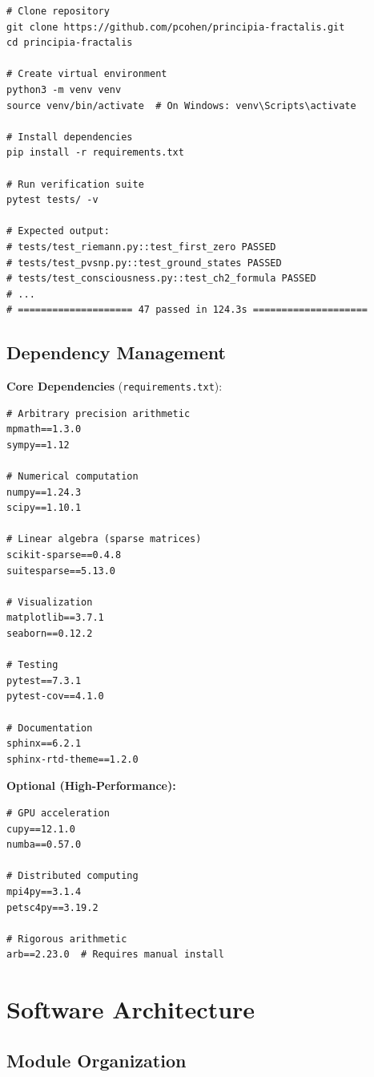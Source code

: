 \begin{verbatim}
# Clone repository
git clone https://github.com/pcohen/principia-fractalis.git
cd principia-fractalis

# Create virtual environment
python3 -m venv venv
source venv/bin/activate  # On Windows: venv\Scripts\activate

# Install dependencies
pip install -r requirements.txt

# Run verification suite
pytest tests/ -v

# Expected output:
# tests/test_riemann.py::test_first_zero PASSED
# tests/test_pvsnp.py::test_ground_states PASSED
# tests/test_consciousness.py::test_ch2_formula PASSED
# ...
# ==================== 47 passed in 124.3s ====================
\end{verbatim}

\subsection{Dependency Management}

\textbf{Core Dependencies} (\texttt{requirements.txt}):
\begin{verbatim}
# Arbitrary precision arithmetic
mpmath==1.3.0
sympy==1.12

# Numerical computation
numpy==1.24.3
scipy==1.10.1

# Linear algebra (sparse matrices)
scikit-sparse==0.4.8
suitesparse==5.13.0

# Visualization
matplotlib==3.7.1
seaborn==0.12.2

# Testing
pytest==7.3.1
pytest-cov==4.1.0

# Documentation
sphinx==6.2.1
sphinx-rtd-theme==1.2.0
\end{verbatim}

\textbf{Optional (High-Performance):}
\begin{verbatim}
# GPU acceleration
cupy==12.1.0
numba==0.57.0

# Distributed computing
mpi4py==3.1.4
petsc4py==3.19.2

# Rigorous arithmetic
arb==2.23.0  # Requires manual install
\end{verbatim}

\section{Software Architecture}
\label{sec:architecture}

\subsection{Module Organization}

